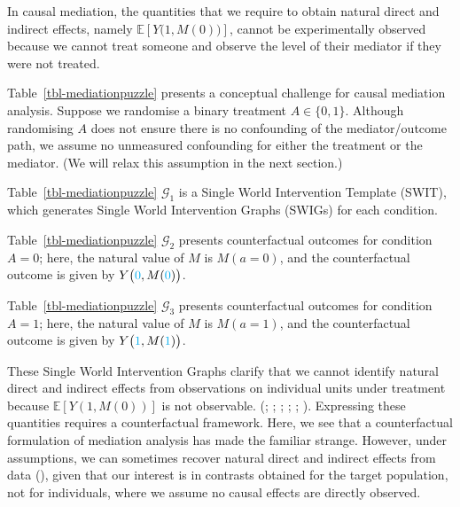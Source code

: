 \documentclass[
  single column]{article}
\begin{document}
\begin{table}

\caption{\label{tbl-mediationpuzzle}In causal mediation, the quantities
that we require to obtain natural direct and indirect effects, namely
\(\mathbb{E}[Y\big(1,M(0)\big)]\), cannot be experimentally observed
because we cannot treat someone and observe the level of their mediator
if they were not treated.}

\centering{

\mediationpuzzle

}

\end{table}%

Table~\ref{tbl-mediationpuzzle} presents a conceptual challenge for
causal mediation analysis. Suppose we randomise a binary treatment
\(A \in \{0,1\}\). Although randomising \(A\) does not ensure there is
no confounding of the mediator/outcome path, we assume no unmeasured
confounding for either the treatment or the mediator. (We will relax
this assumption in the next section.)

Table~\ref{tbl-mediationpuzzle} \(\mathcal{G}_1\) is a Single World
Intervention Template (SWIT), which generates Single World Intervention
Graphs (SWIGs) for each condition.

Table~\ref{tbl-mediationpuzzle} \(\mathcal{G}_2\) presents
counterfactual outcomes for condition \(A = 0\); here, the natural value
of \(M\) is \(M(a = 0)\), and the counterfactual outcome is given by
\(Y\big(\textcolor{cyan}{0}, M(\textcolor{cyan}{0})\big)\).

Table~\ref{tbl-mediationpuzzle} \(\mathcal{G}_3\) presents
counterfactual outcomes for condition \(A = 1\); here, the natural value
of \(M\) is \(M(a = 1)\), and the counterfactual outcome is given by
\(Y\big(\textcolor{cyan}{1}, M(\textcolor{cyan}{1})\big)\).

These Single World Intervention Graphs clarify that we cannot identify
natural direct and indirect effects from observations on individual
units under treatment because \(\mathbb{E}[Y(1, M(0))]\) is not
observable. (;
;
;
;
;
).
Expressing these quantities requires a counterfactual framework. Here,
we see that a counterfactual formulation of mediation analysis has made
the familiar strange. However, under assumptions, we can sometimes
recover natural direct and indirect effects from data
(), given that our
interest is in contrasts obtained for the target population, not for
individuals, where we assume no causal effects are directly observed.
\end{document}
